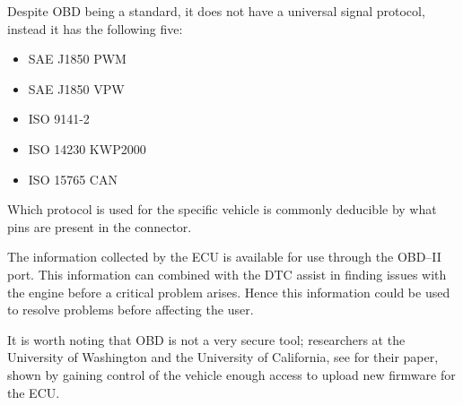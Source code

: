 \bigskip
Despite \ac{OBD} being a standard, it does not have a universal signal protocol, instead it has the following five:
\begin{multicols}{2}
\begin{itemize}
    \item SAE J1850 PWM
    \item SAE J1850 VPW
    \item ISO 9141-2
    \item ISO 14230 KWP2000
    \item ISO 15765 CAN
\end{itemize}
\end{multicols}
Which protocol is used for the specific vehicle is commonly deducible by what pins are present in the connector.

The information collected by the \ac{ECU} is available for use through the OBD--II port.
This information can combined with the \ac{DTC} assist in finding issues with the engine before a critical problem arises.
Hence this information could be used to resolve problems before affecting the user.

\medskip
It is worth noting that \ac{OBD} is not a very secure tool; researchers at the University of Washington and the University of California, see \cite{OBDSecurity} for their paper, shown by gaining control of the vehicle enough access to upload new firmware for the \ac{ECU}.
